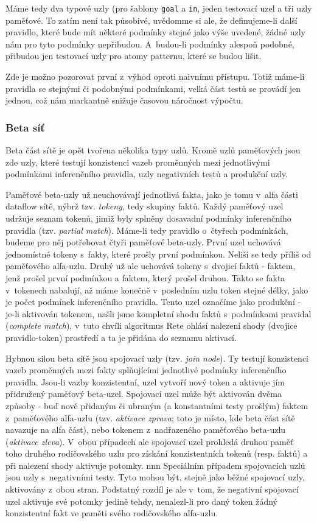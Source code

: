 Máme tedy dva typové uzly (pro šablony \verb|goal| a \verb|in|, jeden
testovací uzel a tři uzly paměťové. To zatím není tak působivé,
uvědomme si ale, že definujeme-li další pravidlo, které bude mít
některé podmínky stejné jako výše uvedené, žádné uzly nám pro tyto
podmínky nepřibudou. A~budou-li podmínky alespoň podobné, přibudou
jen testovací uzly pro atomy patternu, které se budou lišit.

Zde je možno pozorovat první z~výhod oproti naivnímu přístupu. Totiž
máme-li pravidla se stejnými či podobnými podmínkami, velká část testů
se provádí jen jednou, což nám markantně snižuje časovou náročnost výpočtu.
\subsubsection{Beta síť}
Beta část sítě je opět tvořena několika typy uzlů. Kromě uzlů paměťových
jsou zde uzly, které testují konzistenci vazeb proměnných mezi jednotlivými
podmínkami inferenčního pravidla, uzly negativních testů a produkční uzly.

Paměťové beta-uzly už neuchovávají jednotlivá fakta, jako je tomu v~alfa
části dataflow sítě, nýbrž tzv. \emph{tokeny}, tedy skupiny faktů. Každý
paměťový uzel udržuje seznam tokenů, jimiž byly splněny dosavadní podmínky
inferenčního pravidla (tzv. \emph{partial match}). Máme-li tedy pravidlo
o~čtyřech podmínkách, budeme pro něj potřebovat čtyři paměťové beta-uzly.
První uzel uchovává jednomístné tokeny s~fakty, které prošly první podmínkou.
Neliší se tedy příliš od paměťového alfa-uzlu. Druhý už ale uchovává tokeny
s~dvojicí faktů - faktem, jenž prošel první podmínkou a faktem, který prošel
druhou. Takto se fakta v~tokenech nabalují, až máme konečně v~posledním uzlu
token stejné délky, jako je počet podmínek inferenčního pravidla. Tento uzel
označíme jako produkční - je-li aktivován tokenem, našli jsme kompletní
shodu faktů s~podmínkami pravidal (\emph{complete match}), v~tuto chvíli
algoritmus Rete ohlásí nalezení shody (dvojice pravidlo-token) prostředí
a ta je přidána do seznamu aktivací.

Hybnou silou beta síťě jsou spojovací uzly (tzv. \emph{join node}). Ty
testují konzistenci vazeb proměnných mezi fakty splňujícími jednotlivé
podmínky inferenčního pravidla. Jsou-li vazby konzistentní, uzel vytvoří
nový token a aktivuje jím přidružený paměťový beta-uzel. Spojovací uzel
může být aktivován dvěma způsoby - buď nově přidaným či ubraným
(a konstantními testy prošlým) faktem z~paměťového alfa-uzlu (tzv.
\emph{aktivace zprava}; toto je místo, kde beta část sítě navazuje na alfa
část), nebo tokenem z~nadřazeného paměťového beta-uzlu (\emph{aktivace
zleva}). V~obou případech ale spojovací uzel prohledá druhou paměť toho
druhého rodičovského uzlu pro získání konzistentních tokenů (resp. faktů)
a při nalezení shody aktivuje potomky.
nnn
Speciálním případem spojovacích uzlů jsou uzly s~negativními testy. Tyto
mohou být, stejně jako běžné spojovací uzly, aktivovány z~obou stran.
Podstatný rozdíl je ale v~tom, že negativní spojovací uzel aktivuje své
potomky jedině tehdy, nenalezl-li pro daný token žádný konzistentní fakt
ve paměti svého rodičovského alfa-uzlu.

